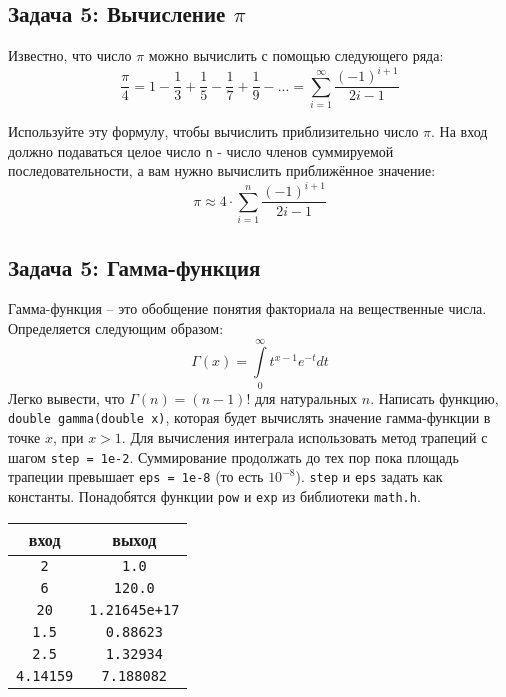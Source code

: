 \documentclass{article}
\begin{document}
\subsection*{Задача 5: Вычисление $\pi$} 
Известно, что число $\pi$ можно вычислить с помощью следующего ряда:
$$
\frac{\pi}{4} = 1 - \frac{1}{3} + \frac{1}{5} - \frac{1}{7} + \frac{1}{9} - ... = \sum_{i=1}^{\infty} \frac{(-1)^{i + 1}}{2i-1}
$$

Используйте эту формулу, чтобы вычислить приблизительно число $\pi$. На вход должно подаваться целое число \texttt{n} - число членов суммируемой последовательности, а вам нужно вычислить приближённое значение:
$$
\pi \approx 4 \cdot \sum_{i=1}^{n} \frac{(-1)^{i + 1}}{2i-1}
$$



\subsection*{Задача 5: Гамма-функция} 
Гамма-функция -- это обобщение понятия факториала на вещественные числа. Определяется следующим образом:
$$
\Gamma \left( x \right) = \int\limits_0^\infty {t^{x - 1} e^{ - t} dt}
$$
Легко вывести, что $\Gamma(n) = (n - 1)!$ для натуральных $n$. Написать функцию, \texttt{double gamma(double x)}, которая будет вычислять значение гамма-функции в точке $x$, при $x > 1$. Для вычисления интеграла использовать метод трапеций с шагом \texttt{step = 1e-2}. Суммирование продолжать до тех пор пока площадь трапеции превышает \texttt{eps = 1e-8} (то есть $10 ^{-8}$). \texttt{step} и \texttt{eps} задать как константы. Понадобятся функции \texttt{pow} и \texttt{exp} из библиотеки \texttt{math.h}.

\begin{center}
\begin{tabular}{ c c }
 вход & выход \\ \hline
 \texttt{2} & \texttt{1.0}  \\ 
 \texttt{6} & \texttt{120.0}  \\
 \texttt{20} & \texttt{1.21645e+17}  \\
 \texttt{1.5} &        \texttt{0.88623} \\
 \texttt{2.5} &        \texttt{1.32934}\\
 \texttt{4.14159} & \texttt{7.188082}\\
\end{tabular}
\end{center}
\end{document}
